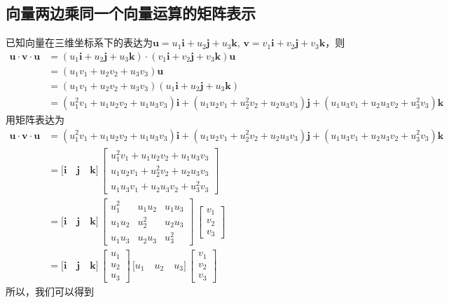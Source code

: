 \subsection{向量两边乘同一个向量运算的矩阵表示}
已知向量在三维坐标系下的表达为$\bm{u} = u_1\bm{i} +u_2\bm{j} +u_3\bm{k}, \, \bm{v} = v_1\bm{i} + v_2\bm{j} + v_3 \bm{k}$，则
\begin{align*}
	\bm{u} \cdot \bm{v} \cdot \bm{u}  &= (u_1\bm{i} +u_2\bm{j} +u_3\bm{k}) \cdot (v_1\bm{i} + v_2\bm{j} + v_3 \bm{k}) \bm{u} \\
	& = (u_1v_1 + u_2v_2 + u_3v_3) \bm{u} \\
	& =  (u_1v_1 + u_2v_2 + u_3v_3) (u_1\bm{i} +u_2\bm{j} +u_3\bm{k}) \\
	& = (u_1^2 v_1 + u_1u_2v_2 + u_1u_3 v_3) \bm{i} + (u_1u_2v_1 + u_2^2 v_2 + u_2u_3v_3)\bm{j} + (u_1u_3v_1 + u_2u_3v_2 + u_3^2v_3) \bm{k}
\end{align*}
用矩阵表达为
\begin{align*}
	\bm{u} \cdot \bm{v} \cdot \bm{u} &= (u_1^2 v_1 + u_1u_2v_2 + u_1u_3 v_3) \bm{i} + (u_1u_2v_1 + u_2^2 v_2 + u_2u_3v_3)\bm{j} + (u_1u_3v_1 + u_2u_3v_2 + u_3^2v_3) \bm{k} \\
	& =
	\big[ \bm{i} \quad \bm{j} \quad \bm{k} \big] \,
	\begin{bmatrix}
		u_1^2v_1 + u_1u_2 v_2 + u_1u_3 v_3 \\
		u_1u_2v_1 + u_2^2 v_2 + u_2u_3v_3 \\
		u_1u_3v_1 + u_2u_3v_2 + u_3^2v_3
	\end{bmatrix}\\[0.5em]
	& = 
	\big[ \bm{i} \quad \bm{j} \quad \bm{k} \big] \,
	\begin{bmatrix}
		u_1^2 & u_1u_2 & u_1u_3 \\
		u_1u_2 & u_2^2 & u_2u_3 \\
		u_1u_3 & u_2u_3 & u_3^2
	\end{bmatrix}
	\,
	\begin{bmatrix}
		v_1 \\
		v_2 \\
		v_3
	\end{bmatrix} \\[0.5em]
& = 
\big[ \bm{i} \quad \bm{j} \quad \bm{k} \big] \,
\begin{bmatrix}
	u_1 \\
	u_2 \\
	u_3
\end{bmatrix}
\,
\big[ u_1 \quad u_2 \quad u_3 \big]
\,
\begin{bmatrix}
	v_1 \\
	v_2 \\
	v_3
\end{bmatrix}
\end{align*}
所以，我们可以得到

